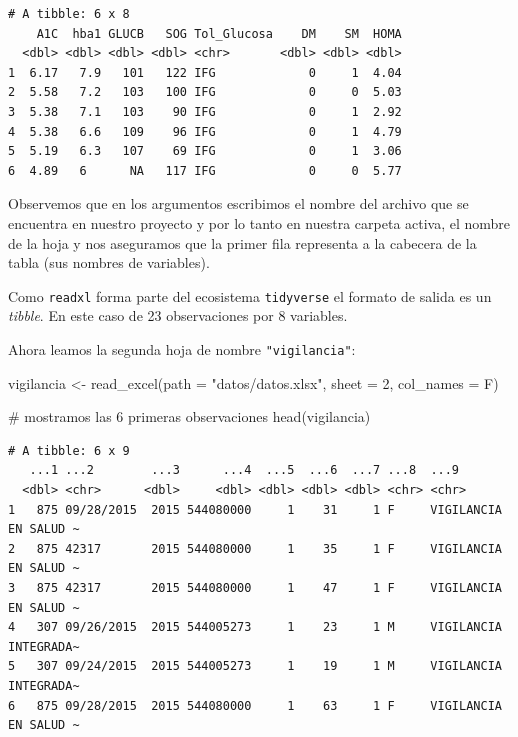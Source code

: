 \documentclass[
  spanish,
  letterpaper,
  DIV=11,
  numbers=noendperiod]{scrreprt}
\newenvironment{Shaded}{\begin{snugshade}}{\end{snugshade}}
\newcommand{\AttributeTok}[1]{\textcolor[rgb]{0.40,0.45,0.13}{#1}}
\newcommand{\CommentTok}[1]{\textcolor[rgb]{0.37,0.37,0.37}{#1}}
\newcommand{\DecValTok}[1]{\textcolor[rgb]{0.68,0.00,0.00}{#1}}
\newcommand{\FunctionTok}[1]{\textcolor[rgb]{0.28,0.35,0.67}{#1}}
\newcommand{\NormalTok}[1]{\textcolor[rgb]{0.00,0.23,0.31}{#1}}
\newcommand{\OtherTok}[1]{\textcolor[rgb]{0.00,0.23,0.31}{#1}}
\newcommand{\StringTok}[1]{\textcolor[rgb]{0.13,0.47,0.30}{#1}}
\begin{document}
\begin{verbatim}
# A tibble: 6 x 8
    A1C  hba1 GLUCB   SOG Tol_Glucosa    DM    SM  HOMA
  <dbl> <dbl> <dbl> <dbl> <chr>       <dbl> <dbl> <dbl>
1  6.17   7.9   101   122 IFG             0     1  4.04
2  5.58   7.2   103   100 IFG             0     0  5.03
3  5.38   7.1   103    90 IFG             0     1  2.92
4  5.38   6.6   109    96 IFG             0     1  4.79
5  5.19   6.3   107    69 IFG             0     1  3.06
6  4.89   6      NA   117 IFG             0     0  5.77
\end{verbatim}

Observemos que en los argumentos escribimos el nombre del archivo que se
encuentra en nuestro proyecto y por lo tanto en nuestra carpeta activa,
el nombre de la hoja y nos aseguramos que la primer fila representa a la
cabecera de la tabla (sus nombres de variables).

Como \texttt{readxl} forma parte del ecosistema \texttt{tidyverse} el
formato de salida es un \emph{tibble}. En este caso de 23 observaciones
por 8 variables.

Ahora leamos la segunda hoja de nombre \texttt{"vigilancia"}:

\begin{Shaded}
\begin{Highlighting}[]
\NormalTok{vigilancia }\OtherTok{\textless{}{-}} \FunctionTok{read\_excel}\NormalTok{(}\AttributeTok{path =} \StringTok{"datos/datos.xlsx"}\NormalTok{, }\AttributeTok{sheet =} \DecValTok{2}\NormalTok{, }\AttributeTok{col\_names =}\NormalTok{ F)}

\CommentTok{\# mostramos las 6 primeras observaciones}
\FunctionTok{head}\NormalTok{(vigilancia)}
\end{Highlighting}
\end{Shaded}

\begin{verbatim}
# A tibble: 6 x 9
   ...1 ...2        ...3      ...4  ...5  ...6  ...7 ...8  ...9                 
  <dbl> <chr>      <dbl>     <dbl> <dbl> <dbl> <dbl> <chr> <chr>                
1   875 09/28/2015  2015 544080000     1    31     1 F     VIGILANCIA EN SALUD ~
2   875 42317       2015 544080000     1    35     1 F     VIGILANCIA EN SALUD ~
3   875 42317       2015 544080000     1    47     1 F     VIGILANCIA EN SALUD ~
4   307 09/26/2015  2015 544005273     1    23     1 M     VIGILANCIA INTEGRADA~
5   307 09/24/2015  2015 544005273     1    19     1 M     VIGILANCIA INTEGRADA~
6   875 09/28/2015  2015 544080000     1    63     1 F     VIGILANCIA EN SALUD ~
\end{verbatim}
\end{document}
